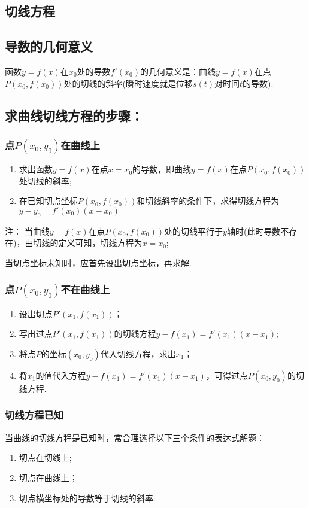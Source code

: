   \subsection{切线方程}
  \subsection{导数的几何意义}
    {\FCom 函数$y=f(x)$在$x_0$处的导数$ f'(x_0) $的几何意义是：曲线$y=f(x)$在点$ P(x_0,f(x_0)) $处的切线的斜率(瞬时速度就是位移$ s(t) $对时间$ t $的导数).}\par
  \subsection{求曲线切线方程的步骤：}
    \subsubsection{点$ P(x_0,y_0) $在曲线上}
      {\FCom \begin{enumerate}[(1)]
      \item 求出函数$y= f(x) $在点$ x=x_0 $的导数，即曲线$y=f(x)$在点$ P(x_0,f(x_0)) $处切线的斜率;
      \item 在已知切点坐标$ P(x_0,f(x_0)) $和切线斜率的条件下，求得切线方程为$ y-y_0=f'(x_0)(x-x_0) $
      \end{enumerate}
      注： 当曲线$y=f(x)$在点$ P(x_0,f(x_0)) $处的切线平行于$y$轴时(此时导数不存在)，由切线的定义可知，切线方程为$ x=x_0 $;\par
       当切点坐标未知时，应首先设出切点坐标，再求解.}
    \subsubsection{点$ P(x_0,y_0) $不在曲线上}
      {\FCom \begin{enumerate}[1)]
      \item 设出切点$P'\left(x_1,f\left(x_1\right)\right)$；
      \item 写出过点$P'\left(x_1,f\left(x_1\right)\right)$的切线方程$ y-f\left(x_1\right)=f'\left(x_1\right)(x-x_1) $;
      \item 将点$ P $的坐标$ \left(x_0,y_0\right) $代入切线方程，求出$ x_1 $；
      \item 将$ x_1 $的值代入方程$y-f\left(x_1\right)=f'\left(x_1\right)(x-x_1) $，可得过点$ P(x_0,y_0) $的切线方程.
      \end{enumerate}}
    \subsubsection{切线方程已知}
      当曲线的切线方程是已知时，常合理选择以下三个条件的表达式解题：
      {\FCom \begin{enumerate}[1)]
        \item 切点在切线上;
        \item 切点在曲线上；
        \item 切点横坐标处的导数等于切线的斜率.
      \end{enumerate}
    }
